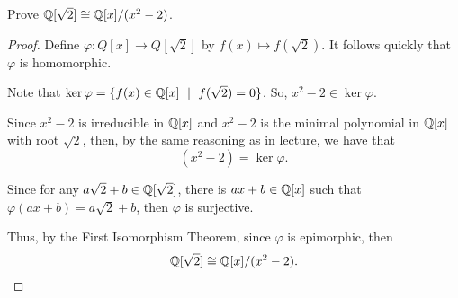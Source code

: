 \documentclass[../hw7]{subfiles}
\begin{document}
\begin{problem}
Prove $\mathbb{Q}[\sqrt{2} ] \cong \mathbb{Q}[x]/(x^2-2)$.
\end{problem}
\begin{proof}
	Define $\varphi:Q[x]\to Q[\sqrt{2} ]$ by $f(x)\mapsto f(\sqrt{2} )$.
	It follows quickly that $\varphi$ is homomorphic.

	Note that  $\ker{\varphi}=\{f(x)\in \Q[x]\ \mid\ f(\sqrt{2} )=0\} $.
	So, $x^2-2\in \ker{\varphi}$.

	Since $x^2-2$ is irreducible in $\mathbb{Q}[x]$ and $x^2-2$ is the minimal polynomial in $\mathbb{Q}[x]$ with root $\sqrt{2}$,
	then, by the same reasoning as in lecture, we have that \[
		(x^2-2)=\ker{\varphi}
		.\]

	Since for any $ a\sqrt{2}+b \in \mathbb{Q}[\sqrt{2} ] $, there is $ax+b\in \mathbb{Q}[x]$ such that $\varphi(ax+b)=a\sqrt{2}+b $, then $\varphi$ is surjective.

	Thus, by the First Isomorphism Theorem, since  $\varphi$ is epimorphic, then  \[
		\mathbb{Q}[\sqrt{2} ] \cong \mathbb{Q}[x]/(x^2-2)
		.\]
\end{proof}
\end{document}
